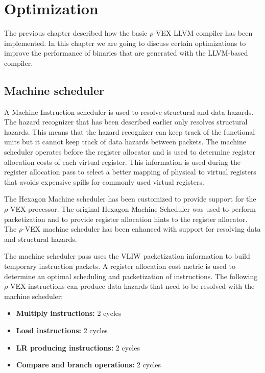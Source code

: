 \chapter{Optimization}
\label{chap:optimization}
The previous chapter described how the basic $\rho$-VEX LLVM compiler has been implemented. In this chapter we are going to discuss certain optimizations to improve the performance of binaries that are generated with the LLVM-based compiler.

\section{Machine scheduler}
A Machine Instruction scheduler is used to resolve structural and data hazards. The hazard recognizer that has been described earlier only resolves structural hazards. This means that the hazard recognizer can keep track of the functional units but it cannot keep track of data hazards between packets. The machine scheduler operates before the register allocator and is used to determine register allocation costs of each virtual register. This information is used during the register allocation pass to select a better mapping of physical to virtual registers that avoids expensive spills for commonly used virtual registers.

The Hexagon Machine scheduler has been customized to provide support for the $\rho$-VEX processor. The original Hexagon Machine Scheduler was used to perform packetization and to provide register allocation hints to the register allocator. The $\rho$-VEX machine scheduler has been enhanced with support for resolving data and structural hazards. 

The machine scheduler pass uses the VLIW packetization information to build temporary instruction packets. A register allocation cost metric is used to determine an optimal scheduling and packetization of instructions. The following $\rho$-VEX instructions can produce data hazards that need to be resolved with the machine scheduler:

\begin{itemize}
  \item \textbf{Multiply instructions:} 2 cycles
  \item \textbf{Load instructions:} 2 cycles
  \item \textbf{LR producing instructions:} 2 cycles
  \item \textbf{Compare and branch operations:} 2 cycles
\end{itemize}

